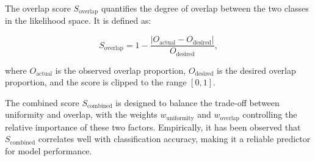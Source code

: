\documentclass[a4paper,12pt]{article}
\begin{document}
The overlap score $S_{\text{overlap}}$ quantifies the degree of overlap between the two classes in the likelihood space. It is defined as:

\[
S_{\text{overlap}} = 1 - \frac{\left| O_{\text{actual}} - O_{\text{desired}} \right|}{O_{\text{desired}}},
\]

where $O_{\text{actual}}$ is the observed overlap proportion, $O_{\text{desired}}$ is the desired overlap proportion, and the score is clipped to the range $[0, 1]$.

The combined score $S_{\text{combined}}$ is designed to balance the trade-off between uniformity and overlap, with the weights $w_{\text{uniformity}}$ and $w_{\text{overlap}}$ controlling the relative importance of these two factors. Empirically, it has been observed that $S_{\text{combined}}$ correlates well with classification accuracy, making it a reliable predictor for model performance.
\end{document}
